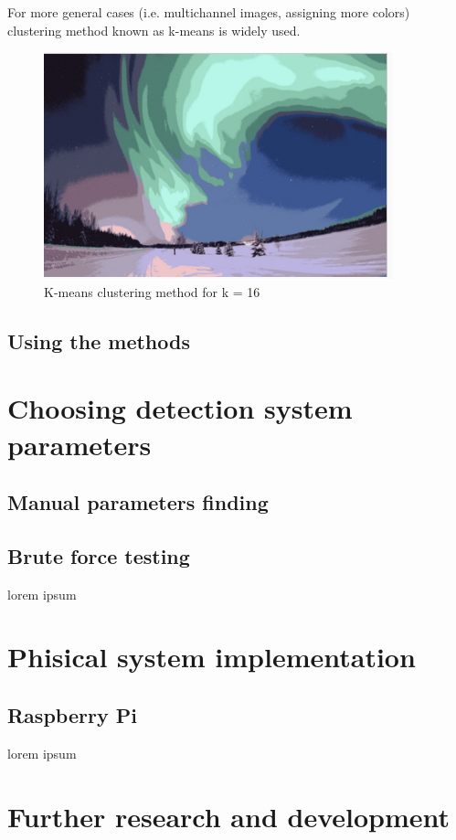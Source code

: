 \documentclass[12pt,twoside,a4paper]{article}
\begin{document}
For more general cases (i.e. multichannel images, assigning more colors) clustering method known as k-means is widely used.\cite{lesscv}
 
\begin{figure}[H]
\centering
\includegraphics[width=0.4\paperwidth]{kmeans}
\caption{K-means clustering method for k = 16\cite{segm}}
\end{figure}
\subsection{Using the methods}


\section{Choosing detection system parameters}
\subsection{Manual parameters finding}

\subsection{Brute force testing}
lorem ipsum
\section{Phisical system implementation}
\subsection{Raspberry Pi}
lorem ipsum
\section{Further research and development}
\end{document}
